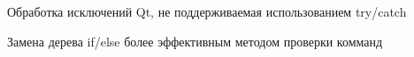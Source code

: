 
\begin{DoxyRefList}
\item[Member \mbox{\hyperlink{functionsforserver_8h_a384a0c7438f42edb2f384963096715bb}{parsing}} (QString data\+\_\+from\+\_\+client, qintptr socket\+Descriptor)]\label{todo__todo000001}%
%
Обработка исключений Qt, не поддерживаемая использованием try/catch 



Замена дерева if/else более эффективным методом проверки комманд 
\end{DoxyRefList}